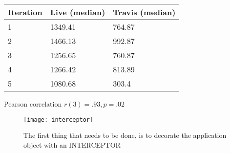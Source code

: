  




\begin{table}[h]
  \begin{tabular}{lll}
    \toprule
    Iteration & \bfseries Live (median) & \bfseries Travis (median)\\
    \midrule
    1 & 1349.41 & 764.87\\ 
    2 & 1466.13 & 992.87\\
    3 & 1256.65 & 760.87\\
    4 & 1266.42 & 813.89\\
    5 & 1080.68 & 303.4\\
    \bottomrule
  \end{tabular}
\end{table}

Pearson correlation $r(3)=.93, p=.02$




    \begin{figure*}[ht!]
      \centering
      \texttt{[image: interceptor]}
      \caption{The first thing that needs to be done, is to decorate the application object with an INTERCEPTOR}
      \label{fig:sep}
    \end{figure*}

\newpage
